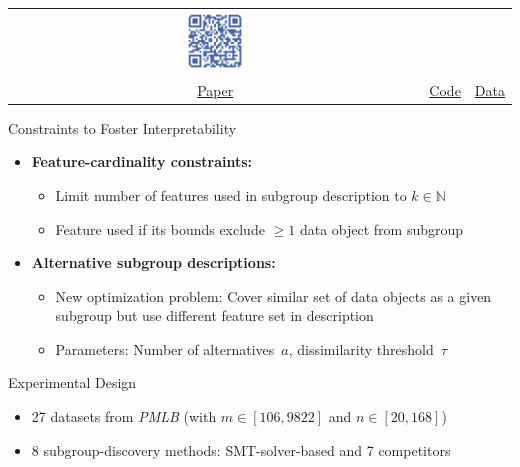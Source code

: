\documentclass[USenglish]{article} %
\begin{document}
\begin{minipage}[t]{0.49\textwidth}
\begin{tabular}{ccc}
		\includegraphics[width=0.15\textwidth]{qr_codes/qr-code-data.pdf} \\
		\href{https://doi.org/10.1145/3725358}{Paper} &
		\href{https://github.com/Jakob-Bach/Constrained-Subgroup-Discovery}{Code} &
		\href{https://doi.org/10.35097/nftgaf7w73hy2491}{Data} \\
	\end{tabular}
\end{minipage}
%
\hfill
%
\begin{minipage}[t]{0.49\textwidth} %
	\vspace{0pt}
	\begin{standardbox}{Constraints to Foster Interpretability}
		\begin{itemize}
			\item \textbf{Feature-cardinality constraints:}
			\begin{itemize}
				\item Limit number of features used in subgroup description to $k \in \mathbb{N}$
				\item Feature used if its bounds exclude $\geq 1$ data object from subgroup
			\end{itemize}
			\vspace{\baselineskip}
			\item \textbf{Alternative subgroup descriptions:}
			\begin{itemize}
				\item New optimization problem: Cover similar set of data objects as a given subgroup but use different feature set in description
				\item Parameters: Number of alternatives~$a$, dissimilarity threshold~$\tau$
			\end{itemize}
		\end{itemize}
	\end{standardbox}
	\vspace{10pt}
	\begin{standardbox}{Experimental Design}
		\begin{itemize}
			\item 27 datasets from \emph{PMLB} (with $m \in [106, 9822]$ and $n \in [20, 168]$)
			\item 8 subgroup-discovery methods: SMT-solver-based and 7 competitors

\end{itemize}
\end{standardbox}
\end{minipage}
\end{document}
